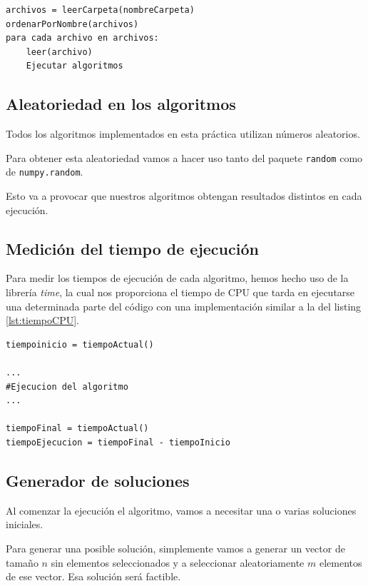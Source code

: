 \begin{lstlisting}[frame=single, caption={Versión búsqueda local}, captionpos=b, label=lst:lecturaArchivos]
archivos = leerCarpeta(nombreCarpeta)
ordenarPorNombre(archivos)
para cada archivo en archivos:
    leer(archivo)
    Ejecutar algoritmos
\end{lstlisting}


\subsection{Aleatoriedad en los algoritmos}

Todos los algoritmos implementados en esta práctica utilizan números aleatorios.

Para obtener esta aleatoriedad vamos a hacer uso tanto del paquete \texttt{random} como de \texttt{numpy.random}.

Esto va a provocar que nuestros algoritmos obtengan resultados distintos en cada ejecución.

\subsection{Medición del tiempo de ejecución}

Para medir los tiempos de ejecución de cada algoritmo, hemos hecho uso de la librería \textit{time}, la cual nos proporciona el tiempo de CPU que tarda en ejecutarse una determinada parte del código con una implementación similar a la del listing \ref{lst:tiempoCPU}.

\begin{lstlisting}[frame=single, caption={Tiempo de ejecución de un programa}, captionpos=b, label=lst:tiempoCPU]
tiempoinicio = tiempoActual()

...
#Ejecucion del algoritmo
...

tiempoFinal = tiempoActual()
tiempoEjecucion = tiempoFinal - tiempoInicio
\end{lstlisting}

\subsection{Generador de soluciones}

Al comenzar la ejecución el algoritmo, vamos a necesitar una o varias soluciones iniciales.

Para generar una posible solución, simplemente vamos a generar un vector de tamaño $n$ sin elementos seleccionados y a seleccionar aleatoriamente $m$ elementos de ese vector.
Esa solución será factible.

